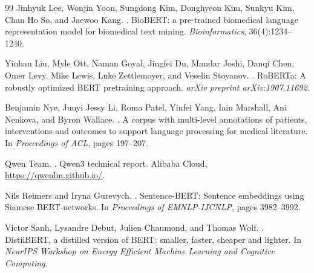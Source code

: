 \documentclass[11pt]{article}
\begin{document}
\begin{thebibliography}{99}
Jinhyuk Lee, Wonjin Yoon, Sungdong Kim, Donghyeon Kim, Sunkyu Kim,
Chan Ho So, and Jaewoo Kang.
.
\newblock BioBERT: a pre-trained biomedical language representation
model for biomedical text mining.
\newblock \emph{Bioinformatics}, 36(4):1234--1240.

Yinhan Liu, Myle Ott, Naman Goyal, Jingfei Du, Mandar Joshi, Danqi
Chen, Omer Levy, Mike Lewis, Luke Zettlemoyer, and Veselin Stoyanov.
.
\newblock RoBERTa: A robustly optimized BERT pretraining approach.
\newblock \emph{arXiv preprint arXiv:1907.11692}.

Benjamin Nye, Junyi Jessy Li, Roma Patel, Yinfei Yang, Iain
Marshall, Ani Nenkova, and Byron Wallace.
.
\newblock A corpus with multi-level annotations of patients,
interventions and outcomes to support language processing for medical
literature.
\newblock In \emph{Proceedings of ACL}, pages 197--207.

Qwen Team.
.
\newblock Qwen3 technical report.
\newblock Alibaba Cloud,
\newblock \url{https://qwenlm.github.io/}.

Nils Reimers and Iryna Gurevych.
.
\newblock Sentence-BERT: Sentence embeddings using Siamese
BERT-networks.
\newblock In \emph{Proceedings of EMNLP-IJCNLP}, pages 3982--3992.

Victor Sanh, Lysandre Debut, Julien Chaumond, and Thomas Wolf.
.
\newblock DistilBERT, a distilled version of BERT: smaller, faster,
cheaper and lighter.
\newblock In \emph{NeurIPS Workshop on Energy Efficient Machine Learning
and Cognitive Computing}.

\end{thebibliography}
\end{document}
